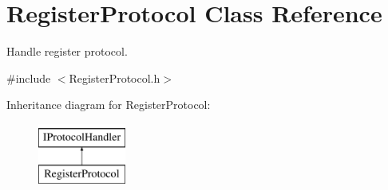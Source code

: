 \hypertarget{class_register_protocol}{\section{Register\-Protocol Class Reference}
\label{class_register_protocol}
}


Handle register protocol.  




{\ttfamily \#include $<$Register\-Protocol.\-h$>$}

Inheritance diagram for Register\-Protocol\-:\begin{figure}[H]
\begin{center}
\leavevmode
\includegraphics[height=2.000000cm]{class_register_protocol}
\end{center}
\end{figure}
